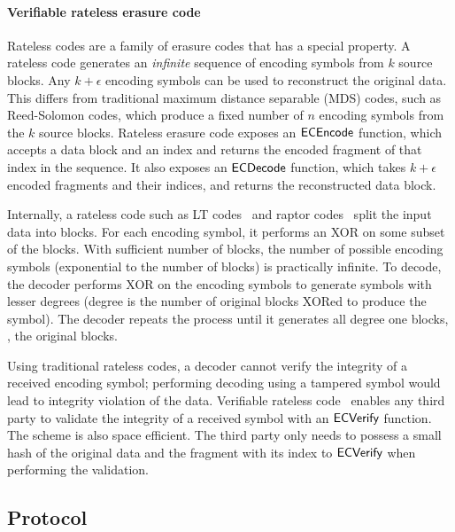 \paragraph{\textbf{Verifiable rateless erasure code}}
Rateless codes are a family of erasure codes that has a special property.
A rateless code generates an \emph{infinite} sequence of encoding symbols from $k$ source blocks.
Any $k + \epsilon$ encoding symbols can be used to reconstruct the original data.
This differs from traditional maximum distance separable (MDS) codes, such as Reed-Solomon codes, which produce a fixed number of $n$ encoding symbols from the $k$ source blocks.
Rateless erasure code exposes an $\textsf{ECEncode}$ function, which accepts a data block and an index and returns the encoded fragment of that index in the sequence.
It also exposes an $\textsf{ECDecode}$ function, which takes $k + \epsilon$ encoded fragments and their indices, and returns the reconstructed data block.

Internally, a rateless code such as LT codes~\cite{lt_code} and raptor codes~\cite{raptor_code} split the input data into blocks.
For each encoding symbol, it performs an XOR on some subset of the blocks.
With sufficient number of blocks, the number of possible encoding symbols (exponential to the number of blocks) is practically infinite.
To decode, the decoder performs XOR on the encoding symbols to generate symbols with lesser degrees (degree is the number of original blocks XORed to produce the symbol).
The decoder repeats the process until it generates all degree one blocks, \ie, the original blocks.

Using traditional rateless codes, a decoder cannot verify the integrity of a received encoding symbol;
performing decoding using a tampered symbol would lead to integrity violation of the data.
Verifiable rateless code~\cite{verify-rateless-ec} enables any third party to validate the integrity of a received symbol with an $\textsf{ECVerify}$ function.
The scheme is also space efficient.
The third party only needs to possess a small hash of the original data and the fragment with its index to $\textsf{ECVerify}$ when performing the validation.

 

\subsection{\sys Protocol}
\label{sec:design:proto}

